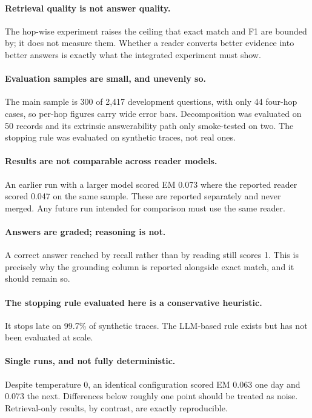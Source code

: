\documentclass[11pt,a4paper]{article}
\begin{document}
\paragraph{Retrieval quality is not answer quality.}
The hop-wise experiment raises the ceiling that exact match and F1 are bounded
by; it does not measure them. Whether a reader converts better evidence into
better answers is exactly what the integrated experiment must show.

\paragraph{Evaluation samples are small, and unevenly so.}
The main sample is 300 of 2{,}417 development questions, with only 44 four-hop
cases, so per-hop figures carry wide error bars. Decomposition was evaluated on
50 records and its extrinsic answerability path only smoke-tested on two. The
stopping rule was evaluated on synthetic traces, not real ones.

\paragraph{Results are not comparable across reader models.}
An earlier run with a larger model scored EM 0.073 where the reported reader
scored 0.047 on the same sample. These are reported separately and never merged.
Any future run intended for comparison must use the same reader.

\paragraph{Answers are graded; reasoning is not.}
A correct answer reached by recall rather than by reading still scores 1. This is
precisely why the grounding column is reported alongside exact match, and it
should remain so.

\paragraph{The stopping rule evaluated here is a conservative heuristic.}
It stops late on 99.7\% of synthetic traces. The LLM-based rule exists but has
not been evaluated at scale.

\paragraph{Single runs, and not fully deterministic.}
Despite temperature 0, an identical configuration scored EM 0.063 one day and
0.073 the next. Differences below roughly one point should be treated as noise.
Retrieval-only results, by contrast, are exactly reproducible.
\end{document}
